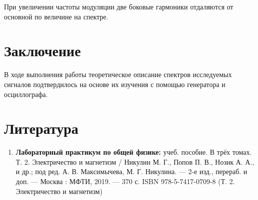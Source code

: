 \documentclass[a4paper, 12pt]{article}%
\begin{document}
При увеличении частоты модуляции две боковые гармоники отдаляются от основной по величине на спектре.


\section{Заключение}

В ходе выполнения работы теоретическое описание спектров исследуемых сигналов подтвердилось на основе их изучения с помощью генератора и осциллографа.
 
\section{Литература}

\begin{enumerate}

\item \textbf{Лабораторный практикум по общей физике:} учеб. пособие. В трёх томах. Т. 2. Электричество и магнетизм /
Никулин М. Г., Попов П. В., Нозик А. А., и др.; под ред. А. В. Мак­симычева, М. Г. Никулина. — 2-е изд., перераб. и доп. — Москва : МФТИ, 2019. — 370 с.
ISBN 978-5-7417-0709-8 (Т. 2. Электричество и магнетизм)
\end{enumerate}		
		
\end{document}
